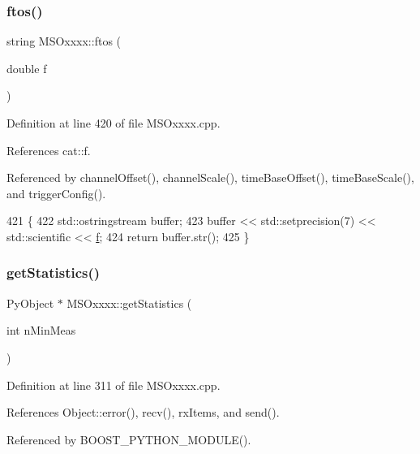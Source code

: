 \subsubsection{\texorpdfstring{ftos()}{ftos()}}
{\footnotesize\ttfamily string M\+S\+Oxxxx\+::ftos (\begin{DoxyParamCaption}\item[{double}]{f }\end{DoxyParamCaption})\hspace{0.3cm}{\ttfamily [private]}}



Definition at line 420 of file M\+S\+Oxxxx.\+cpp.



References cat\+::f.



Referenced by channel\+Offset(), channel\+Scale(), time\+Base\+Offset(), time\+Base\+Scale(), and trigger\+Config().


\begin{DoxyCode}
421 \{
422     std::ostringstream buffer;
423     buffer << std::setprecision(7) << std::scientific << \hyperlink{namespacecat_ac4e5e84140346d3c05a72261c63ef7b1}{f};
424     \textcolor{keywordflow}{return} buffer.str();
425 \}
\end{DoxyCode}
\mbox{\label{classMSOxxxx_a38f15b6ad8bc3cdc1836d784b3e96c59}} 
\subsubsection{\texorpdfstring{get\+Statistics()}{getStatistics()}}
{\footnotesize\ttfamily Py\+Object $\ast$ M\+S\+Oxxxx\+::get\+Statistics (\begin{DoxyParamCaption}\item[{int}]{n\+Min\+Meas }\end{DoxyParamCaption})}



Definition at line 311 of file M\+S\+Oxxxx.\+cpp.



References Object\+::error(), recv(), rx\+Items, and send().



Referenced by B\+O\+O\+S\+T\+\_\+\+P\+Y\+T\+H\+O\+N\+\_\+\+M\+O\+D\+U\+L\+E().


